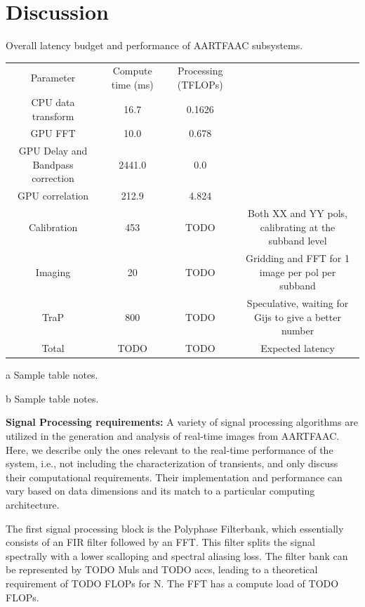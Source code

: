 \documentclass{ws-jai}
\begin{document}
\section {\label{sec:discussion} Discussion}
\begin{wstable}[h]
\caption{Overall latency budget and performance of AARTFAAC subsystems.}
\begin{tabular}{@{}cccc@{}} \toprule
Parameter & Compute time (ms) & Processing (TFLOPs)\\ \colrule
CPU data transform & 16.7 &0.1626  \\
GPU FFT & \hphantom{0}10.0&0.678  \\
GPU Delay and Bandpass correction & 2441.0 & 0.0\tnote{a}  \\
GPU correlation & 212.9 & 4.824\tnote{a}  \\
Calibration & 453 & TODO & Both XX and YY pols, calibrating at the subband level \\
Imaging & 20 & TODO & Gridding and FFT for 1 image per pol per subband \\ 
TraP & 800 & TODO & Speculative, waiting for Gijs to give a better number\\
 \colrule
Total & TODO & TODO & Expected latency

\end{tabular}
\begin{tablenotes}
\item[a] Sample table notes.
\item[b] Sample table notes.
\end{tablenotes}
\label{tab:afaac_specs}
\end{wstable}

\noindent \textbf {Signal Processing requirements:}
A variety  of signal processing  algorithms are  utilized in the  generation and
analysis of  real-time images from  AARTFAAC.  Here,  we describe only  the ones
relevant to  the real-time performance  of the  system, i.e., not  including the
characterization   of  transients,   and   only   discuss  their   computational
requirements.  Their  implementation and  performance  can  vary based  on  data
dimensions and its match to a particular computing architecture.

The first signal processing block is the Polyphase Filterbank, which essentially
consists of  an FIR  filter followed by  an FFT. This  filter splits  the signal
spectrally with a  lower scalloping and spectral aliasing loss.  The filter bank
can  be  represented by  TODO  Muls  and TODO  accs,  leading  to a  theoretical
requirement of TODO FLOPs for N. The FFT has a compute load of TODO FLOPs.
\end{document}
